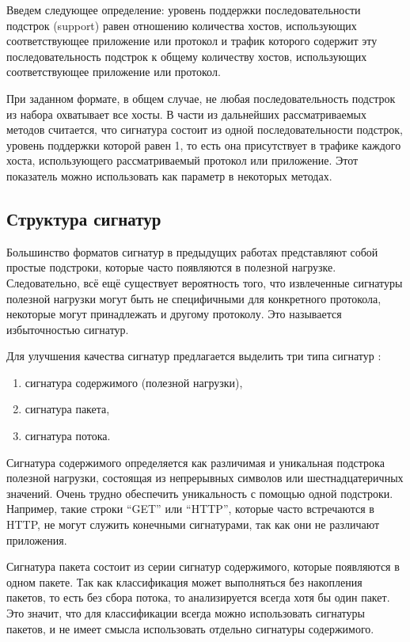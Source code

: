 Введем следующее определение: уровень поддержки последовательности подстрок (support) равен отношению количества хостов,
использующих соответствующее приложение или протокол и трафик которого содержит эту последовательность подстрок
к общему количеству хостов, использующих соответствующее приложение или протокол.

При заданном формате, в общем случае, не любая последовательность подстрок из набора охватывает все хосты.
В части из дальнейших рассматриваемых методов считается, что сигнатура состоит из одной последовательности подстрок,
уровень поддержки которой равен 1, то есть она присутствует в трафике каждого хоста, использующего рассматриваемый протокол
или приложение. Этот показатель можно использовать как параметр в некоторых методах.

\subsection{Структура сигнатур}

Большинство форматов сигнатур в предыдущих работах \cite{park2008towards,ye2009autosig,santosautomatic}
представляют собой простые подстроки, которые часто появляются в полезной нагрузке.
Следовательно, всё ещё существует вероятность того, что извлеченные сигнатуры полезной нагрузки могут быть не специфичными
для конкретного протокола, некоторые могут принадлежать и другому протоколу. Это называется избыточностью сигнатур.

Для улучшения качества сигнатур предлагается выделить три типа сигнатур \cite{goo2016payload, shim2019automatic}:

\begin{enumerate}
    \item сигнатура содержимого (полезной нагрузки),
    \item сигнатура пакета,
    \item сигнатура потока.
\end{enumerate}

Сигнатура содержимого определяется как различимая и уникальная подстрока полезной нагрузки, состоящая из непрерывных символов или
шестнадцатеричных значений. Очень трудно обеспечить уникальность с помощью одной подстроки. Например,
такие строки ``GET''  или ``HTTP'', которые часто встречаются в HTTP, не могут служить конечными сигнатурами,
так как они не различают приложения.

Сигнатура пакета состоит из серии сигнатур содержимого, которые появляются в одном пакете.
Так как классификация может выполняться без накопления пакетов, то есть без сбора потока, то анализируется всегда хотя бы один пакет.
Это значит, что для классификации всегда можно использовать сигнатуры пакетов, и не имеет смысла использовать отдельно сигнатуры
содержимого.

